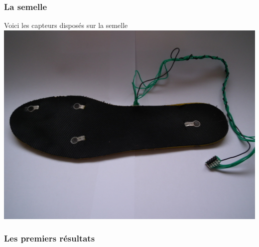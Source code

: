 \begin{frame}
\frametitle{La semelle}
Voici les capteurs disposés sur la semelle
\includegraphics[width=\textwidth]{./figures/sem_00.jpg}

\end{frame}

\begin{frame}
\frametitle{Les premiers résultats}

\end{frame}
